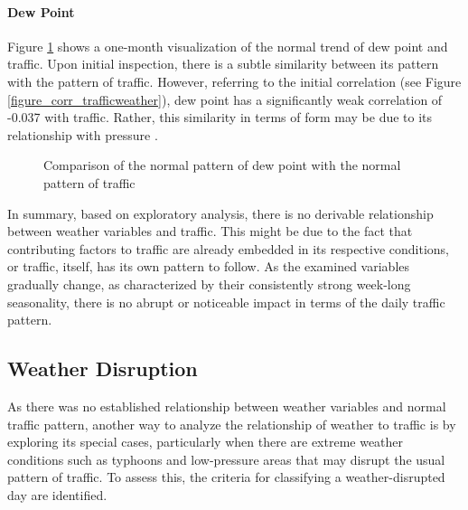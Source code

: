 
\paragraph{Dew Point}

Figure \ref{figure_traffic_vs_dewpoint} shows a one-month visualization of the normal trend of dew point and traffic. Upon initial inspection, there is a subtle similarity between its pattern with the pattern of traffic. However, referring to the initial correlation (see Figure \ref{figure_corr_trafficweather}), dew point has a significantly weak correlation of -0.037 with traffic. Rather, this similarity in terms of form may be due to its relationship with pressure .

\begin{figure}[h]
  \centering
  \captionsetup{justification=centering}
  \caption{Comparison of the normal pattern of dew point with the normal pattern of traffic}
\label{figure_traffic_vs_dewpoint}
\end{figure}



In summary, based on exploratory analysis, there is no derivable relationship between weather variables and traffic. This might be due to the fact that contributing factors to traffic are already embedded in its respective conditions, or traffic, itself, has its own pattern to follow. As the examined variables gradually change, as characterized by their consistently strong week-long seasonality, there is no abrupt or noticeable impact in terms of the daily traffic pattern.

\subsection{Weather Disruption}
As there was no established relationship between weather variables and normal traffic pattern, another way to analyze the relationship of weather to traffic is by exploring its special cases, particularly when there are extreme weather conditions such as typhoons and low-pressure areas that may disrupt the usual pattern of traffic. To assess this, the criteria for classifying a weather-disrupted day are identified.

